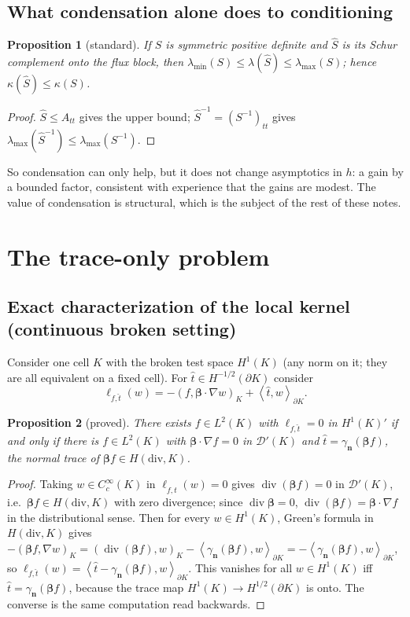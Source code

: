 \documentclass[11pt]{article}
\newtheorem{proposition}{Proposition}
\theoremstyle{remark}
\theoremstyle{definition}
\newcommand{\bbeta}{\boldsymbol{\beta}}
\newcommand{\bn}{\boldsymbol{n}}
\newcommand{\that}{\hat{t}}
\newcommand{\Shat}{\widehat{S}}
\newcommand{\ip}[2]{\left(#1,#2\right)}
\newcommand{\dual}[2]{\left\langle #1,#2\right\rangle}
\DeclareMathOperator{\divz}{div}
\begin{document}
\subsection{What condensation alone does to conditioning}

\begin{proposition}[standard]\label{prop:schur}
If $S$ is symmetric positive definite and $\Shat$ is its Schur complement onto the flux block, then
$\lambda_{\min}(S)\le\lambda(\Shat)\le\lambda_{\max}(S)$; hence $\kappa(\Shat)\le\kappa(S)$.
\end{proposition}
\begin{proof}
$\Shat \le A_{tt}$ gives the upper bound; $\Shat^{-1} = (S^{-1})_{tt}$ gives $\lambda_{\max}(\Shat^{-1})\le
\lambda_{\max}(S^{-1})$.
\end{proof}
So condensation can only help, but it does not change asymptotics in $h$: a gain by a bounded factor, consistent with
experience that the gains are modest.  The value of condensation is structural, which is the subject of the rest of
these notes.

\section{The trace-only problem}

\subsection{Exact characterization of the local kernel (continuous broken setting)}

Consider one cell $K$ with the broken test space $H^1(K)$ (any norm on it; they are all equivalent on a fixed cell).
For $\that\in H^{-1/2}(\partial K)$ consider
\[
  \ell_{f,\that}(w) = -\ip{f}{\bbeta\cdot\nabla w}_K + \dual{\that}{w}_{\partial K}.
\]

\begin{proposition}[proved]\label{prop:kernel}
There exists $f\in L^2(K)$ with $\ell_{f,\that}=0$ in $H^1(K)'$ if and only if there is $f\in L^2(K)$ with
$\bbeta\cdot\nabla f=0$ in $\mathcal D'(K)$ and $\that = \gamma_{\bn}(\bbeta f)$, the normal trace of $\bbeta f\in
H(\mathrm{div},K)$.
\end{proposition}
\begin{proof}
Taking $w\in C_c^\infty(K)$ in $\ell_{f,\that}(w)=0$ gives $\divz(\bbeta f)=0$ in $\mathcal D'(K)$, i.e.\ $\bbeta f\in
H(\mathrm{div},K)$ with zero divergence; since $\divz\bbeta=0$, $\divz(\bbeta f)=\bbeta\cdot\nabla f$ in the
distributional sense.  Then for every $w\in H^1(K)$, Green's formula in $H(\mathrm{div},K)$ gives
$-\ip{\bbeta f}{\nabla w}_K = \ip{\divz(\bbeta f)}{w}_K - \dual{\gamma_{\bn}(\bbeta f)}{w}_{\partial K}
= -\dual{\gamma_{\bn}(\bbeta f)}{w}_{\partial K}$, so $\ell_{f,\that}(w) = \dual{\that-\gamma_{\bn}(\bbeta f)}{w}_{\partial K}$.
This vanishes for all $w\in H^1(K)$ iff $\that=\gamma_{\bn}(\bbeta f)$, because the trace map $H^1(K)\to
H^{1/2}(\partial K)$ is onto.  The converse is the same computation read backwards.
\end{proof}
\end{document}
